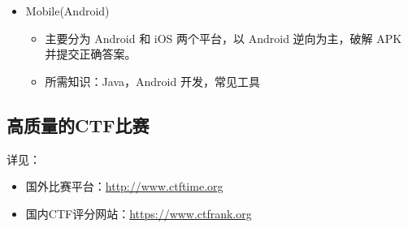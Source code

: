 \begin{itemize}
    \item Mobile(Android)
    \begin{itemize}
        \item 主要分为 Android 和 iOS 两个平台，以 Android 逆向为主，破解 APK 并提交正确答案。
        \item 所需知识：Java，Android 开发，常见工具
    \end{itemize}
\end{itemize}

\subsection{高质量的CTF比赛}
\indent \setlength{\parindent}{2em}

\indent 详见：
\begin{itemize}
    \item 国外比赛平台：\url{http://www.ctftime.org}
    \item 国内CTF评分网站：\url{https://www.ctfrank.org}
\end{itemize}


